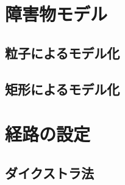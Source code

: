 \section{障害物モデル}

\subsection{粒子によるモデル化}

\subsection{矩形によるモデル化}

\section{経路の設定}

\subsection{ダイクストラ法}



